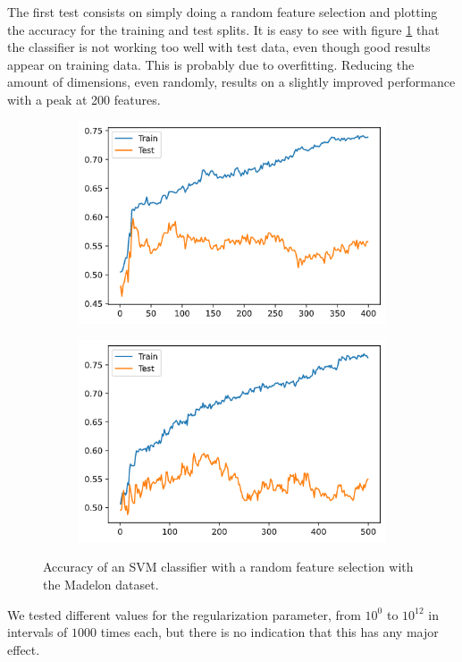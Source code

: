 The first test consists on simply doing a random feature selection and plotting the accuracy for the training and test splits. It is easy to see with figure \ref{fig:dynamicStep.madelon.base} that the classifier is not working too well with test data, even though good results appear on training data. This is probably due to overfitting. Reducing the amount of dimensions, even randomly, results on a slightly improved performance with a peak at 200 features.

\begin{figure}[h]
    \centering
    \begin{subfigure}[b]{0.4\linewidth}
        \includegraphics[width=\linewidth]{img/madelon-base-1.png}
    \end{subfigure}
    \begin{subfigure}[b]{0.4\linewidth}
        \includegraphics[width=\linewidth]{img/madelon-base-2.png}
    \end{subfigure}
    \caption{Accuracy of an SVM classifier with a random feature selection with the Madelon dataset.}
    \label{fig:dynamicStep.madelon.base}
\end{figure}

We tested different values for the regularization parameter, from $10^0$ to $10^{12}$ in intervals of $1000$ times each, but there is no indication that this has any major effect.







